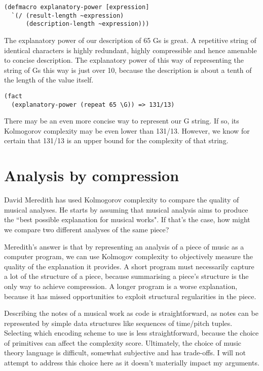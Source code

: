 \documentclass[numbers]{sigplanconf}
\begin{document}
\begin{verbatim}
(defmacro explanatory-power [expression]
  `(/ (result-length ~expression)
      (description-length ~expression)))
\end{verbatim}

The explanatory power of our description of 65 Gs is great. A repetitive string of identical characters is
highly redundant, highly compressible and hence amenable to concise description. The explanatory power of this way of
representing the string of Gs this way is just over 10, because the description is about a tenth of the length of the
value itself.

\begin{verbatim}
(fact
  (explanatory-power (repeat 65 \G)) => 131/13)
\end{verbatim}

There may be an even more concise way to represent our G string. If so, its Kolmogorov complexity may be even lower than
131/13. However, we know for certain that 131/13 is an upper bound for the complexity of that string.

\section{Analysis by compression}

David Meredith has used Kolmogorov complexity to compare the quality of musical analyses\cite{Analysis by Compression}.
He starts by assuming that musical analysis aims to produce the ``best possible explanation for musical works". If that's the case,
how might we compare two different analyses of the same piece?

Meredith's answer is that by representing an analysis of a piece of music as a computer program, we can use Kolmogov complexity
to objectively measure the quality of the explanation it provides. A short program must necessarily capture a lot of the structure
of a piece, because summarising a piece's structure is the only way to achieve compression. A longer program is a worse explanation,
because it has missed opportunities to exploit structural regularities in the piece.

Describing the notes of a musical work as code is straightforward, as notes can be represented by simple data structures like
sequences of time/pitch tuples. Selecting which encoding scheme to use is less straightforward, because the choice of primitives
can affect the complexity score. Ultimately, the choice of music theory language is difficult, somewhat subjective and
has trade-offs. I will not attempt to address this choice here as it doesn't materially impact my arguments.
\end{document}
